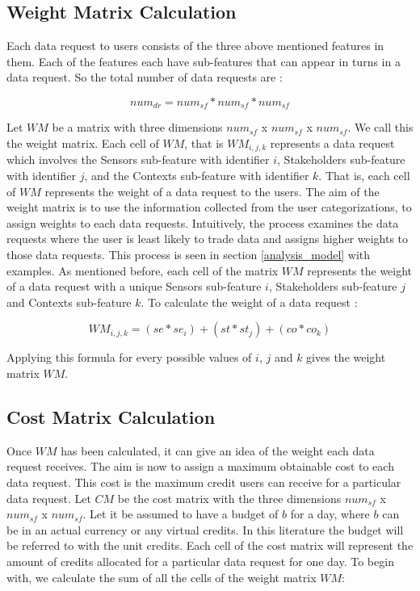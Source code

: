 \subsection{Weight Matrix Calculation}
Each data request to users consists of the three above mentioned features in them. Each of the features each have \numsubfeatures sub-features that can appear in turns in a data request. So the total number of data requests are :

\begin{equation}
num_{dr} =  num_{sf} * num_{sf} * num_{sf}   
\end{equation}

Let $WM$  be a matrix with three dimensions $num_{sf}$ x $num_{sf}$ x $num_{sf}$. We call this the weight matrix.
Each cell of $WM$, that is $WM_{i,j,k}$ represents a data request which involves the Sensors sub-feature with identifier $i$, Stakeholders sub-feature with identifier $j$,
and the Contexts sub-feature with identifier $k$. That is, each cell of $WM$ represents the weight of a data request to the users. The aim of the weight matrix is to use the information collected from the user categorizations, to assign weights to each data requests. Intuitively, the process examines the
data requests where the user is least likely to trade data and assigns higher weights to those data requests. This process is seen in
section \ref{analysis_model} with examples. As mentioned before, each cell of the matrix $WM$ represents the weight of a data request with a unique Sensors sub-feature $i$, Stakeholders sub-feature $j$ and Contexts sub-feature $k$. To calculate the weight of a data request :

\begin{equation}
WM_{i,j,k} = (se*se_{i}) + (st*st_{j}) + (co*co_{k})
\end{equation}

Applying this formula for every possible values of $i$, $j$ and $k$ gives the weight matrix $WM$.

\subsection{Cost Matrix Calculation}

Once $WM$ has been calculated, it can give an idea of the weight each data request receives. The aim is now to assign a maximum obtainable cost to each data request. This cost is the maximum credit users can receive for a particular data request. Let $CM$ be the cost matrix with the three dimensions $num_{sf}$ x $num_{sf}$ x $num_{sf}$.
Let it be assumed to have a budget of $b$ for a day, where
$b$ can be in an actual currency or any virtual credits. In this literature the budget will be referred to with the unit credits. Each cell of the cost matrix will represent the amount of credits allocated for a particular data request for one day.
To begin with, we calculate the sum of all the cells of the weight matrix $WM$:

